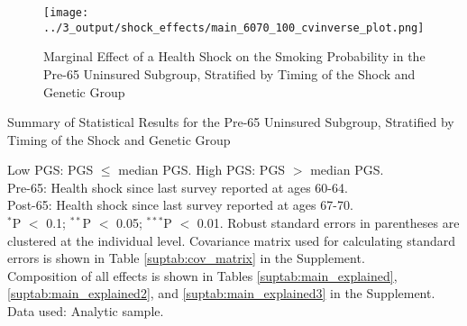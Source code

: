 \documentclass[12pt]{article}
\begin{document}
\captionsetup{width = \columnwidth}
\begin{figure}[!h]
	\begin{center}
		\texttt{[image: ../3\_output/shock\_effects/main\_6070\_100\_cvinverse\_plot.png]}
		\caption{Marginal Effect of a Health Shock on the Smoking Probability in the Pre-65 Uninsured Subgroup, Stratified by Timing of the Shock and Genetic Group\vspace{-3mm}
			\label{fig:shock_effects}}
	\end{center}
\end{figure}




\captionsetup{width = 9cm}
\begin{table*}[h]
	\caption{Summary of Statistical Results for the Pre-65 Uninsured Subgroup, Stratified by Timing of the Shock and Genetic Group}
	\label{tab:main_effects}
	
		\begin{flushleft}
			Low PGS: PGS $\leq$ median PGS. High PGS: PGS $>$ median PGS.\\
			Pre-65: Health shock since last survey reported at ages 60-64.\\
			Post-65: Health shock since last survey reported at ages 67-70.\\
			$^{*}$P $<$ 0.1; $^{**}$P $<$ 0.05; $^{***}$P $<$ 0.01. Robust standard errors in parentheses are clustered at the individual level. Covariance matrix used for calculating standard errors is shown in Table \ref*{suptab:cov_matrix} in the Supplement.\\
			Composition of all effects is shown in Tables \ref*{suptab:main_explained}, \ref*{suptab:main_explained2}, and \ref*{suptab:main_explained3} in the Supplement. Data used: Analytic sample.
		\end{flushleft}
\end{table*}
\end{document}
